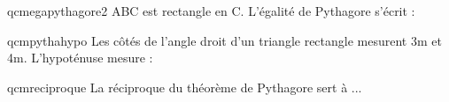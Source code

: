 \documentclass[12pt]{extarticle}
\begin{document}
{\begin{exercicebox}[\it{(Pythagore)}]


    \begin{question}{qcmegapythagore2}    
        ABC est rectangle en C. L'égalité de Pythagore s'écrit :
        \begin{reponses}
        \end{reponses}
    \end{question}

    \begin{question}{qcmpythahypo}
        Les côtés de l'angle droit d'un triangle rectangle mesurent 3m et 4m.
        L'hypoténuse mesure :
        \begin{reponseshoriz}
        \end{reponseshoriz}
    \end{question}


    \begin{question}{qcmreciproque}    
        La réciproque du théorème de Pythagore sert à ...
        \begin{reponses}
        \end{reponses}
    \end{question}

\end{exercicebox}


}   
\end{document}
